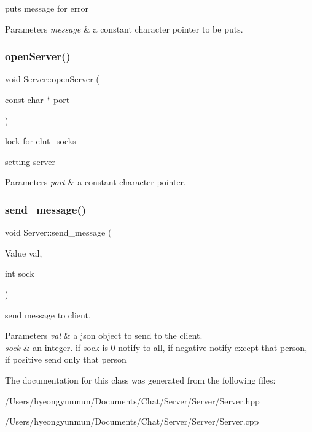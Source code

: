 puts message for error 


\begin{DoxyParams}{Parameters}
{\em message} & a constant character pointer to be puts. \\
\hline
\end{DoxyParams}
\mbox{\label{class_server_aff3205e599f2b9680b38407d4d3fe2fb}} 
\subsubsection{\texorpdfstring{open\+Server()}{openServer()}}
{\footnotesize\ttfamily void Server\+::open\+Server (\begin{DoxyParamCaption}\item[{const char $\ast$}]{port }\end{DoxyParamCaption})}



lock for clnt\+\_\+socks 

setting server


\begin{DoxyParams}{Parameters}
{\em port} & a constant character pointer. \\
\hline
\end{DoxyParams}
\mbox{\label{class_server_ab16fa72c38eb792401edf5698007d805}} 
\subsubsection{\texorpdfstring{send\+\_\+message()}{send\_message()}}
{\footnotesize\ttfamily void Server\+::send\+\_\+message (\begin{DoxyParamCaption}\item[{Value}]{val,  }\item[{int}]{sock }\end{DoxyParamCaption})}



send message to client. 


\begin{DoxyParams}{Parameters}
{\em val} & a json object to send to the client. \\
\hline
{\em sock} & an integer. if sock is 0 notify to all, if negative notify except that person, if positive send only that person \\
\hline
\end{DoxyParams}


The documentation for this class was generated from the following files\+:\begin{DoxyCompactItemize}
\item 
/\+Users/hyeongyunmun/\+Documents/\+Chat/\+Server/\+Server/Server.\+hpp\item 
/\+Users/hyeongyunmun/\+Documents/\+Chat/\+Server/\+Server/Server.\+cpp\end{DoxyCompactItemize}
